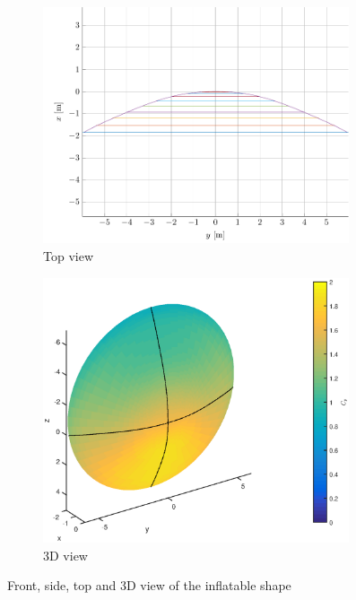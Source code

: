 \begin{figure}[h]
\begin{subfigure}[b]{0.49\textwidth}
		\includegraphics[width=0.99\textwidth]{./Figure/Aerodynamics/topview.pdf}
		\caption{Top view}
		\label{fig:aeroshape.topview}
	\end{subfigure}
	\begin{subfigure}[b]{0.49\textwidth}
		\includegraphics[width=0.99\textwidth]{./Figure/Aerodynamics/geometry_cp.eps}
		\caption{3D view}
		\label{fig:aeroshape.isoview}
	\end{subfigure}
	\caption{Front, side, top and 3D view of the inflatable shape}
\end{figure}
 
